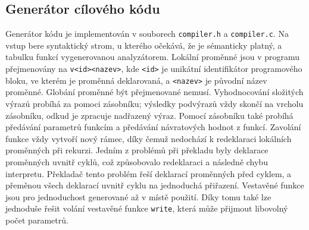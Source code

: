 \subsection{Generátor cílového kódu}
Generátor kódu je implementován v souborech \texttt{compiler.h} a \texttt{compiler.c}.
Na vstup bere syntaktický strom, u kterého očekává, že je sémanticky platný, a tabulku funkcí vygenerovanou analyzátorem.
Lokální proměnné jsou v programu přejmenovány na \texttt{v<id><nazev>}, kde \texttt{<id>} je unikátní identifikátor
programového bloku, ve kterém je proměnná deklarovaná, a \texttt{<nazev>} je původní název proměnné.
Globání proměnné být přejmenované nemusí.
Vyhodnocování složitých výrazů probíhá za pomoci zásobníku; výsledky podvýrazů vždy skončí na vrcholu zásobníku, odkud je zpracuje nadřazený výraz.
Pomocí zásobníku také probíhá předávání parametrů funkcím a předávání návratových hodnot z funkcí.
Zavolání funkce vždy vytvoří nový rámec, díky čemuž nedochází k redeklaraci lokálních proměnných při rekurzi.
Jedním z problémů při překladu byly deklarace proměnných uvnitř cyklů, což způsobovalo redeklaraci a následně chybu interpretu.
Překladač tento problém řeší deklarací proměnných před cyklem, a přeměnou všech deklarací uvnitř cyklu na jednoduchá přiřazení.
Vestavěné funkce jsou pro jednoduchost generované až v místě použití.
Díky tomu také lze jednoduše řešit volání vestavěné funkce \texttt{write}, která může přijmout libovolný počet parametrů.
